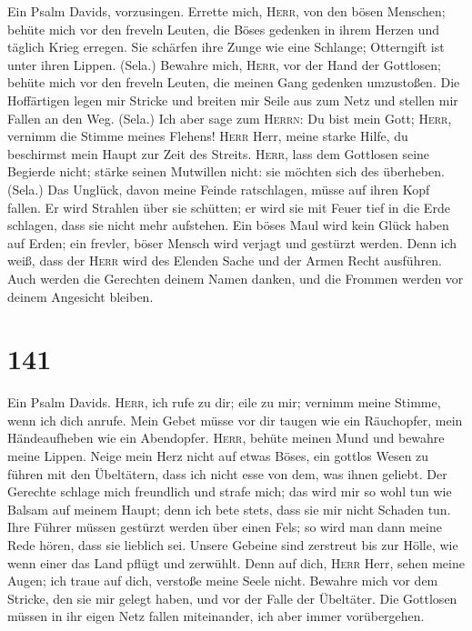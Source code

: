  Ein Psalm Davids, vorzusingen.  Errette
mich, \textsc{Herr}, von den bösen Menschen; behüte mich vor den freveln
Leuten,  die Böses gedenken in ihrem Herzen und täglich
Krieg erregen.  Sie schärfen ihre Zunge wie eine Schlange;
Otterngift ist unter ihren Lippen. (Sela.)  Bewahre mich,
\textsc{Herr}, vor der Hand der Gottlosen; behüte mich vor den freveln
Leuten, die meinen Gang gedenken umzustoßen.  Die
Hoffärtigen legen mir Stricke und breiten mir Seile aus zum Netz und
stellen mir Fallen an den Weg. (Sela.)  Ich aber sage zum
\textsc{Herrn}: Du bist mein Gott; \textsc{Herr}, vernimm die Stimme
meines Flehens!  \textsc{Herr} Herr, meine starke Hilfe,
du beschirmst mein Haupt zur Zeit des Streits. 
\textsc{Herr}, lass dem Gottlosen seine Begierde nicht; stärke seinen
Mutwillen nicht: sie möchten sich des überheben. (Sela.) 
Das Unglück, davon meine Feinde ratschlagen, müsse auf ihren Kopf
fallen.  Er wird Strahlen über sie schütten; er wird sie
mit Feuer tief in die Erde schlagen, dass sie nicht mehr aufstehen.
 Ein böses Maul wird kein Glück haben auf Erden; ein
frevler, böser Mensch wird verjagt und gestürzt werden. 
Denn ich weiß, dass der \textsc{Herr} wird des Elenden Sache und der
Armen Recht ausführen.  Auch werden die Gerechten deinem
Namen danken, und die Frommen werden vor deinem Angesicht bleiben.

\hypertarget{section-140}{%
\section{141}\label{section-140}}

 Ein Psalm Davids. \textsc{Herr}, ich rufe zu dir; eile zu
mir; vernimm meine Stimme, wenn ich dich anrufe.  Mein
Gebet müsse vor dir taugen wie ein Räuchopfer, mein Händeaufheben wie
ein Abendopfer.  \textsc{Herr}, behüte meinen Mund und
bewahre meine Lippen.  Neige mein Herz nicht auf etwas
Böses, ein gottlos Wesen zu führen mit den Übeltätern, dass ich nicht
esse von dem, was ihnen geliebt.  Der Gerechte schlage
mich freundlich und strafe mich; das wird mir so wohl tun wie Balsam auf
meinem Haupt; denn ich bete stets, dass sie mir nicht Schaden tun.
 Ihre Führer müssen gestürzt werden über einen Fels; so
wird man dann meine Rede hören, dass sie lieblich sei. 
Unsere Gebeine sind zerstreut bis zur Hölle, wie wenn einer das Land
pflügt und zerwühlt.  Denn auf dich, \textsc{Herr} Herr,
sehen meine Augen; ich traue auf dich, verstoße meine Seele nicht.
 Bewahre mich vor dem Stricke, den sie mir gelegt haben,
und vor der Falle der Übeltäter.  Die Gottlosen müssen in
ihr eigen Netz fallen miteinander, ich aber immer vorübergehen.

